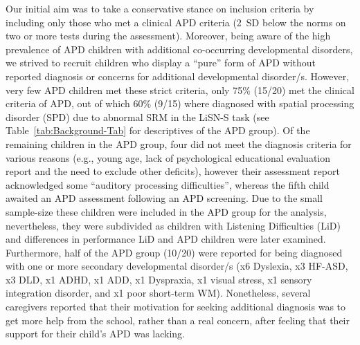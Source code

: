 \documentclass[a4paper, twoside]{templates/ociamthesis}
\begin{document}
Our initial aim was to take a conservative stance on inclusion criteria by including only those who met a clinical APD criteria (2~SD below the norms on two or more tests during the assessment). Moreover, being aware of the high prevalence of APD children with additional co-occurring developmental disorders, we strived to recruit children who display a ``pure'' form of APD without reported diagnosis or concerns for additional developmental disorder/s. However, very few APD children met these strict criteria, only 75\% (15/20) met the clinical criteria of APD, out of which 60\% (9/15) where diagnosed with spatial processing disorder (SPD) due to abnormal SRM in the LiSN-S task (see Table~\ref{tab:Background-Tab} for descriptives of the APD group). Of the remaining children in the APD group, four did not meet the diagnosis criteria for various reasons (e.g., young age, lack of psychological educational evaluation report and the need to exclude other deficits), however their assessment report acknowledged some ``auditory processing difficulties'', whereas the fifth child awaited an APD assessment following an APD screening. Due to the small sample-size these children were included in the APD group for the analysis, nevertheless, they were subdivided as children with Listening Difficulties (LiD) and differences in performance LiD and APD children were later examined. Furthermore, half of the APD group (10/20) were reported for being diagnosed with one or more secondary developmental disorder/s (x6 Dyslexia, x3 HF-ASD, x3 DLD, x1 ADHD, x1 ADD, x1 Dyspraxia, x1 visual stress, x1 sensory integration disorder, and x1 poor short-term WM). Nonetheless, several caregivers reported that their motivation for seeking additional diagnosis was to get more help from the school, rather than a real concern, after feeling that their support for their child's APD was lacking.\\
\end{document}
